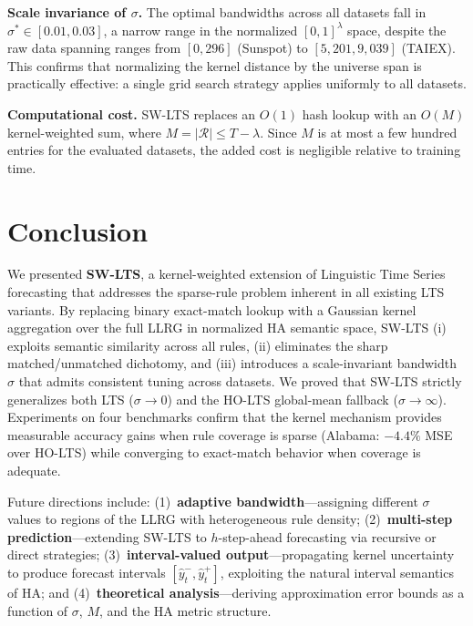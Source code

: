\documentclass[conference]{IEEEtran}
\begin{document}
\textbf{Scale invariance of $\sigma$.}
The optimal bandwidths across all datasets fall in $\sigma^* \in
[0.01, 0.03]$, a narrow range in the normalized $[0,1]^\lambda$ space,
despite the raw data spanning ranges from $[0, 296]$ (Sunspot) to
$[5{,}201, 9{,}039]$ (TAIEX). This confirms that normalizing the
kernel distance by the universe span is practically effective: a
single grid search strategy applies uniformly to all datasets.

\textbf{Computational cost.}
SW-LTS replaces an $O(1)$ hash lookup with an $O(M)$ kernel-weighted
sum, where $M = |\mathcal{R}| \leq T-\lambda$. Since $M$ is at most
a few hundred entries for the evaluated datasets, the added cost is
negligible relative to training time.

\section{Conclusion}
\label{sec:conclusion}

We presented \textbf{SW-LTS}, a kernel-weighted extension of
Linguistic Time Series forecasting that addresses the sparse-rule
problem inherent in all existing LTS variants. By replacing binary
exact-match lookup with a Gaussian kernel aggregation over the full
LLRG in normalized HA semantic space, SW-LTS (i) exploits semantic
similarity across all rules, (ii) eliminates the sharp
matched/unmatched dichotomy, and (iii) introduces a scale-invariant
bandwidth $\sigma$ that admits consistent tuning across datasets.
We proved that SW-LTS strictly generalizes both LTS ($\sigma \to 0$)
and the HO-LTS global-mean fallback ($\sigma \to \infty$). Experiments
on four benchmarks confirm that the kernel mechanism provides
measurable accuracy gains when rule coverage is sparse (Alabama:
$-4.4\%$ MSE over HO-LTS) while converging to exact-match behavior
when coverage is adequate.

Future directions include: (1)~\textbf{adaptive bandwidth}---assigning
different $\sigma$ values to regions of the LLRG with heterogeneous
rule density; (2)~\textbf{multi-step prediction}---extending SW-LTS to
$h$-step-ahead forecasting via recursive or direct strategies;
(3)~\textbf{interval-valued output}---propagating kernel uncertainty
to produce forecast intervals $[\hat{y}^-_t, \hat{y}^+_t]$, exploiting
the natural interval semantics of HA; and (4)~\textbf{theoretical
analysis}---deriving approximation error bounds as a function of
$\sigma$, $M$, and the HA metric structure.
\end{document}
